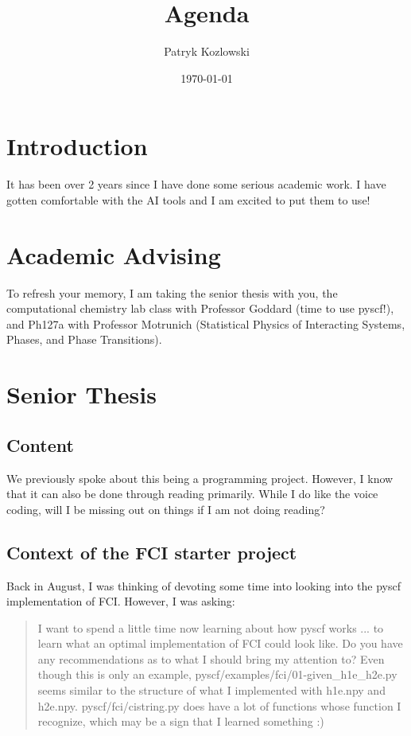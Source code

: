 \documentclass[12pt]{article}
\title{Agenda}
\author{Patryk Kozlowski}
\date{\today}
\begin{document}
\maketitle
\section{Introduction}
It has been over 2 years since I have done some serious academic work. I have gotten comfortable with the AI tools and I am excited to put them to use!

\section{Academic Advising}
To refresh your memory, I am taking the senior thesis with you, the computational chemistry lab class with Professor Goddard (time to use pyscf!), and Ph127a with Professor Motrunich (Statistical Physics of Interacting Systems, Phases, and Phase Transitions).

\section{Senior Thesis}
\subsection{Content}
We previously spoke about this being a programming project. However, I know that it can also be done through reading primarily. While I do like the voice coding, will I be missing out on things if I am not doing reading?
\subsection{Context of the FCI starter project}
Back in August, I was thinking of devoting some time into looking into the pyscf implementation of FCI. However, I was asking:

\begin{quote}
I want to spend a little time now learning about how pyscf works ... to learn what an optimal implementation of FCI could look like. Do you have any recommendations as to what I should bring my attention to? Even though this is only an example, pyscf/examples/fci/01-given\_h1e\_h2e.py seems similar to the structure of what I implemented with h1e.npy and h2e.npy. pyscf/fci/cistring.py does have a lot of functions whose function I recognize, which may be a sign that I learned something :)

\end{quote}
\end{document}
